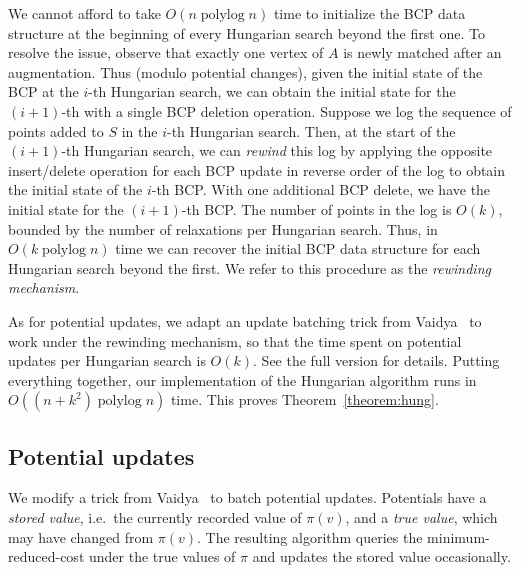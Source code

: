 \documentclass[a4paper,UKenglish]{socg-lipics-v2018}
\def\polylog{\mathop{\mathrm{polylog}}}
\theoremstyle{plain}
\numberwithin{figure}{section}
\def\EMPH#1{\textcolor{BrickRed}{{\emph{#1}}}}
\begin{document}
We cannot afford to take $O(n\polylog n)$ time to initialize the BCP data structure at the
beginning of every Hungarian search beyond the first one.
To resolve the issue, observe that exactly one vertex of $A$ is newly matched after an augmentation.
Thus (modulo potential changes), given the initial state of the BCP at the $i$-th Hungarian search,
we can obtain the initial state for the $(i+1)$-th with a single BCP deletion operation.
Suppose we log the sequence of points added to $S$ in the $i$-th Hungarian search.
Then, at the start of the $(i+1)$-th Hungarian search, we can \emph{rewind} this
log by applying the opposite insert/delete operation for each BCP update in
reverse order of the log to obtain the initial state of the $i$-th BCP.
With one additional BCP delete, we have the initial state for the $(i+1)$-th BCP.
The number of points in the log is $O(k)$, bounded by the number of relaxations
per Hungarian search.
Thus, in $O(k\polylog n)$ time we can recover the initial BCP data structure
for each Hungarian search beyond the first.
We refer to this procedure as the \EMPH{rewinding mechanism}.

As for potential updates, we adapt an update batching trick from Vaidya~\cite{Vaidya89}
to work under the rewinding mechanism, so that the time spent on potential
updates per Hungarian search is $O(k)$.
See the full version for details.
%
Putting everything together, our implementation of the Hungarian algorithm runs
in $O((n + k^2)\polylog n)$ time.
This proves Theorem~\ref{theorem:hung}.

\subsection{Potential updates}
\label{SS:potential-update}

We modify a trick from Vaidya~\cite{Vaidya89} to batch potential updates.
Potentials have a \EMPH{stored value}, i.e.\ the currently recorded value of
$\pi(v)$, and a \EMPH{true value}, which may have changed from $\pi(v)$.
The resulting algorithm queries the minimum-reduced-cost under the true values
of $\pi$ and updates the stored value occasionally.
\end{document}
